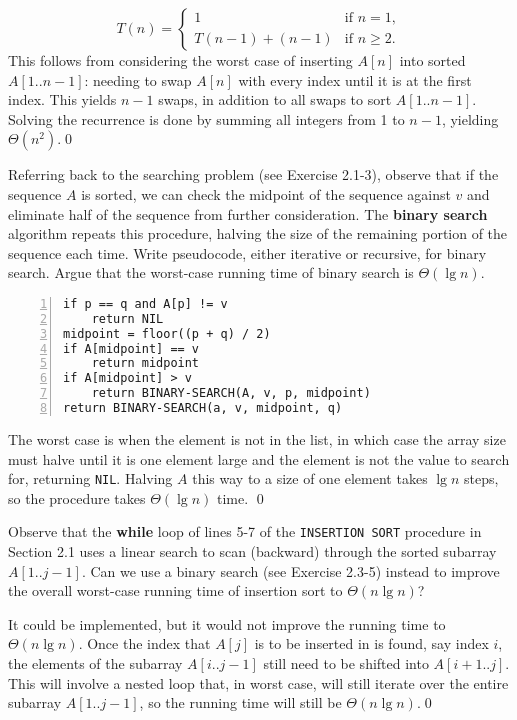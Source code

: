 \sol $$T(n) = \begin{cases}
    1 & \text{if } n=1, \\
    T(n-1) + (n-1)& \text{if } n \geq 2.
\end{cases}$$
This follows from considering the worst case of inserting $A[n]$ into sorted $A[1..n-1]$: needing to swap $A[n]$ with every index until it is at the first index. This yields $n-1$ swaps, in addition to all swaps to sort $A[1..n-1]$. Solving the recurrence is done by summing all integers from 1 to $n-1$, yielding $\Theta(n^2)$.\qed

 Referring back to the searching problem (see Exercise 2.1-3), observe that if the sequence $A$ is sorted, we can check the midpoint of the sequence against $v$ and eliminate half of the sequence from further consideration. The \textbf{binary search} algorithm repeats this procedure, halving the size of the remaining portion of the sequence each time. Write pseudocode, either iterative or recursive, for binary search. Argue that the worst-case running time of binary search is $\Theta(\lg n)$.

\sol \begin{Verbatim}[frame=single,numbers=left,samepage=true,label={BINARY-SEARCH(A, v, p, q)}]
if p == q and A[p] != v
    return NIL
midpoint = floor((p + q) / 2)
if A[midpoint] == v
    return midpoint
if A[midpoint] > v
    return BINARY-SEARCH(A, v, p, midpoint)
return BINARY-SEARCH(a, v, midpoint, q)
\end{Verbatim}
The worst case is when the element is not in the list, in which case the array size must halve until it is one element large and the element is not the value to search for, returning \verb|NIL|. Halving $A$ this way to a size of one element takes $\lg n$ steps, so the procedure takes $\Theta(\lg n)$ time.
\qed

 Observe that the \textbf{while} loop of lines 5-7 of the \verb|INSERTION SORT| procedure in Section 2.1 uses a linear search to scan (backward) through the sorted subarray $A[1..j-1]$. Can we use a binary search (see Exercise 2.3-5) instead to improve the overall worst-case running time of insertion sort to $\Theta(n \lg n)$?

\sol It could be implemented, but it would not improve the running time to $\Theta(n \lg n)$. Once the index that $A[j]$ is to be inserted in is found, say index $i$, the elements of the subarray $A[i..j-1]$ still need to be shifted into $A[i+1..j]$. This will involve a nested loop that, in worst case, will still iterate over the entire subarray $A[1..j-1]$, so the running time will still be $\Theta(n \lg n)$.\qed

